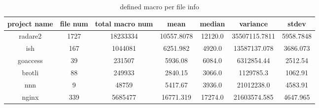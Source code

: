 \begin{table}[h]
	\caption{defined macro per file info}
	\label{table:defined_macro_info}	
		\begin{tabular}{ccccccc}
		\hline
		project name & file num & total macro num & mean & median & variance & stdev \\ 
		\hline \hline
		radare2 & 1727 & 18233334 & 10557.8078 & 12120.0 & 35507115.7811 & 5958.7848 \\ 
		\hline
		ish & 167 & 1044081 & 6251.982 & 4920.0 & 13587137.078 & 3686.073 \\ 
		\hline
		goaccess & 39 & 231507 & 5936.08 & 6084.0 & 6312854.44 & 2512.54 \\ 
		\hline
		brotli & 88 & 249933 & 2840.15 & 3066.0 & 1129785.3 & 1062.91 \\ 
		\hline
		nnn & 9 & 48759 & 5417.67 & 3936.0 & 21012238.0 & 4583.91 \\ 
		\hline
		nginx & 339 & 5685477 & 16771.319 & 17274.0 & 21603574.585 & 4647.965 \\ 
		\hline
	\end{tabular}
\end{table}